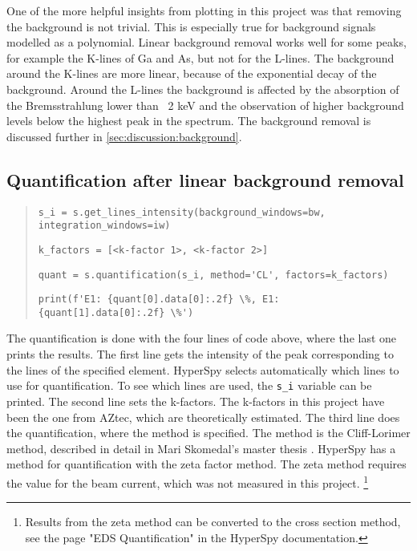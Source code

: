 One of the more helpful insights from plotting in this project was that removing the background is not trivial.
This is especially true for background signals modelled as a polynomial.
Linear background removal works well for some peaks, for example the K-lines of Ga and As, but not for the L-lines.
The background around the K-lines are more linear, because of the exponential decay of the background.
Around the L-lines the background is affected by the absorption of the Bremsstrahlung lower than ~2 keV and the observation of higher background levels below the highest peak in the spectrum.
The background removal is discussed further in \cref{sec:discussion:background}.




\subsection{Quantification after linear background removal}
\label{sec:discussion:steps:quantification:linear}

\begin{quote}
    \verb|s_i = s.get_lines_intensity(background_windows=bw, integration_windows=iw)|

    \verb|k_factors = [<k-factor 1>, <k-factor 2>]  |

    \verb|quant = s.quantification(s_i, method='CL', factors=k_factors)|

    \verb|print(f'E1: {quant[0].data[0]:.2f} \%, E1: {quant[1].data[0]:.2f} \%')|
\end{quote}

The quantification is done with the four lines of code above, where the last one prints the results.
The first line gets the intensity of the peak corresponding to the lines of the specified element.
HyperSpy selects automatically which lines to use for quantification.
To see which lines are used, the \verb|s_i| variable can be printed.
The second line sets the k-factors.
The k-factors in this project have been the one from AZtec, which are theoretically estimated.
The third line does the quantification, where the method is specified.
The method is the Cliff-Lorimer method, described in detail in Mari Skomedal's master thesis \cite[Sec. 2.2.3]{skomedal_improving_2022}.
HyperSpy has a method for quantification with the zeta factor method.
The zeta method requires the value for the beam current, which was not measured in this project. \footnote{Results from the zeta method can be converted to the cross section method, see the page "EDS Quantification" in the HyperSpy documentation.}


